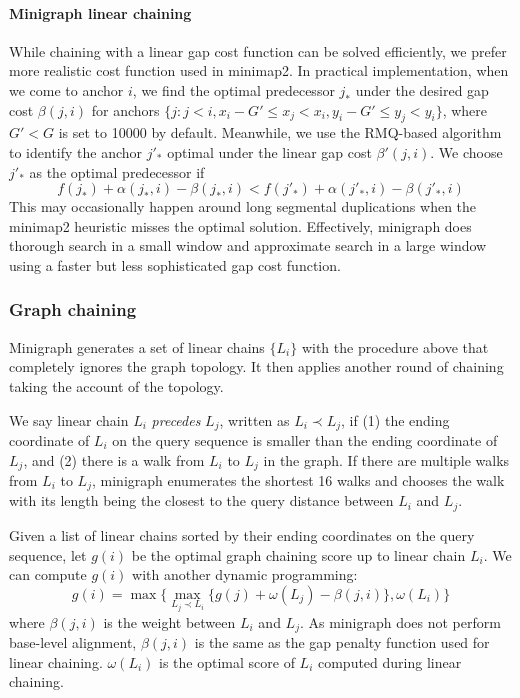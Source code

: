 \documentclass[twocolumn]{bmcart}%
\begin{document}
\paragraph*{Minigraph linear chaining}
While chaining with a linear gap cost function can be solved efficiently, we
prefer more realistic cost function used in minimap2. In practical
implementation, when we come to anchor $i$, we find the optimal predecessor $j_*$
under the desired gap cost $\beta(j,i)$ for anchors $\{j:j<i,x_i-G'\le
x_j<x_i,y_i-G'\le y_j<y_i\}$, where $G'<G$ is set to 10000 by default.
Meanwhile, we use the RMQ-based algorithm to identify the anchor $j'_{*}$ optimal
under the linear gap cost $\beta'(j,i)$. We choose $j'_*$ as the optimal
predecessor if
$$
f(j_*)+\alpha(j_*,i)-\beta(j_*,i)<f(j'_*)+\alpha(j'_*,i)-\beta(j'_*,i)
$$
This may occasionally happen around long segmental duplications when the
minimap2 heuristic misses the optimal solution. Effectively, minigraph does
thorough search in a small window and approximate search in a large window
using a faster but less sophisticated gap cost function.

\subsubsection*{Graph chaining}

Minigraph generates a set of linear chains $\{L_i\}$ with the procedure above
that completely ignores the graph topology. It then applies another round of
chaining taking the account of the topology.

We say linear chain $L_i$ \emph{precedes} $L_j$, written as $L_i\prec L_j$, if
(1) the ending coordinate of $L_i$ on the query sequence is smaller than the
ending coordinate of $L_j$, and (2) there is a walk from $L_i$ to $L_j$ in the
graph. If there are multiple walks from $L_i$ to $L_j$, minigraph enumerates
the shortest 16 walks and chooses the walk with its length being the closest to
the query distance between $L_i$ and $L_j$.

Given a list of linear chains sorted by their ending coordinates on the query
sequence, let $g(i)$ be the optimal graph chaining score up to linear chain
$L_i$. We can compute $g(i)$ with another dynamic programming:
$$
g(i)=\max\big\{\max_{L_j\prec L_i}\{g(j)+\omega(L_j)-\beta(j,i)\},\omega(L_i)\big\}
$$
where $\beta(j,i)$ is the weight between $L_i$ and $L_j$. As minigraph does not
perform base-level alignment, $\beta(j,i)$ is the same as the gap penalty
function used for linear chaining. $\omega(L_i)$ is the optimal score of $L_i$
computed during linear chaining.
\end{document}
